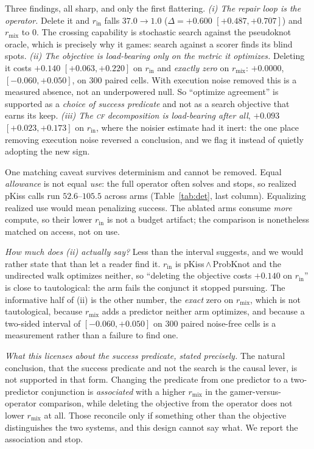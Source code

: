 \documentclass[11pt]{article}
\newcommand{\CF}{\textsc{cf}}
\begin{document}
Three findings, all sharp, and only the first flattering. \emph{(i) The repair loop is the operator.} Delete
it and $r_{\mathrm{in}}$ falls $37.0\to1.0$ ($\Delta{=}{+}0.600$ $[{+}0.487,{+}0.707]$) and $r_{\mathrm{mix}}$
to $0$. The crossing capability is stochastic search against the pseudoknot oracle, which is precisely why it
games: search against a scorer finds its blind spots. \emph{(ii) The objective is load-bearing only on the
metric it optimizes.} Deleting it costs ${+}0.140$ $[{+}0.063,{+}0.220]$ on $r_{\mathrm{in}}$ and
\emph{exactly zero} on $r_{\mathrm{mix}}$: ${+}0.0000$, $[{-}0.060,{+}0.050]$, on $300$ paired cells. With
execution noise removed this is a measured absence, not an underpowered null. So ``optimize agreement'' is
supported as a \emph{choice of success predicate} and not as a search objective that earns its keep.
\emph{(iii) The \CF{} decomposition is load-bearing after all}, ${+}0.093$ $[{+}0.023,{+}0.173]$ on
$r_{\mathrm{in}}$, where the noisier estimate had it inert: the one place removing execution noise reversed a
conclusion, and we flag it instead of quietly adopting the new sign.

One matching caveat survives determinism and cannot be removed. Equal \emph{allowance} is not equal
\emph{use}: the full operator often solves and stops, so realized pKiss calls run $52.6$--$105.5$ across arms
(Table~\ref{tab:det}, last column). Equalizing realized use would mean penalizing success. The ablated arms
consume \emph{more} compute, so their lower $r_{\mathrm{in}}$ is not a budget artifact; the comparison is
nonetheless matched on access, not on use.

\emph{How much does (ii) actually say?} Less than the interval suggests, and we would rather state that than
let a reader find it. $r_{\mathrm{in}}$ is pKiss\,$\wedge$\,ProbKnot and the undirected walk optimizes
neither, so ``deleting the objective costs ${+}0.140$ on $r_{\mathrm{in}}$'' is close to tautological: the
arm fails the conjunct it stopped pursuing. The informative half of (ii) is the other number, the
\emph{exact} zero on $r_{\mathrm{mix}}$, which is not tautological, because $r_{\mathrm{mix}}$ adds a
predictor neither arm optimizes, and because a two-sided interval of $[{-}0.060,{+}0.050]$ on $300$ paired
noise-free cells is a measurement rather than a failure to find one.

\emph{What this licenses about the success predicate, stated precisely.} The natural conclusion, that the success predicate and not the search is the causal lever, is not supported in that form. Changing the
predicate from one predictor to a two-predictor conjunction is \emph{associated} with a higher
$r_{\mathrm{mix}}$ in the gamer-versus-operator comparison, while deleting the objective from the operator
does not lower $r_{\mathrm{mix}}$ at all. Those reconcile only if something other than the objective
distinguishes the two systems, and this design cannot say what. We report the association and stop.
\end{document}
